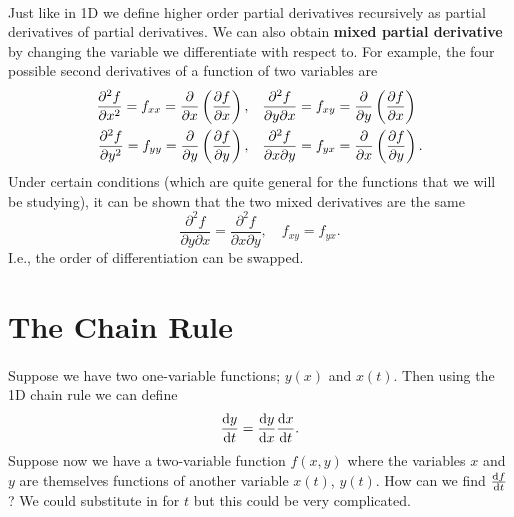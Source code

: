 \documentclass[../multivariate_calculus.tex]{subfiles}
\begin{document}
        \paragraph{}
        Just like in 1D we define higher order partial derivatives recursively as partial derivatives of partial derivatives.
        We can also obtain \textbf{mixed partial derivative} by changing the variable we differentiate with respect to.
        For example, the four possible second derivatives of a function of two variables are
        \begin{align}
            \pdv[2]{f}{x}=f_{xx}=\pdv{}{x}\left(\pdv{f}{x}\right),&\quad\frac{\partial^2 f}{\partial y\partial x}=f_{xy}=\pdv{}{y}\left(\pdv{f}{x}\right)\\
            \pdv[2]{f}{y}=f_{yy}=\pdv{}{y}\left(\pdv{f}{y}\right),&\quad\frac{\partial^2 f}{\partial x\partial y}=f_{yx}=\pdv{}{x}\left(\pdv{f}{y}\right).
        \end{align}
        Under certain conditions (which are quite general for the functions that we will be studying), it can be shown that the two mixed derivatives are the same
        \begin{equation}
            \frac{\partial^2 f}{\partial y\partial x}=\frac{\partial^2 f}{\partial x\partial y},\quad f_{xy}=f_{yx}.
        \end{equation}
        I.e., the order of differentiation can be swapped.

    \section{The Chain Rule}
        \paragraph{}
        Suppose we have two one-variable functions; $y(x)$ and $x(t)$.
        Then using the 1D chain rule we can define
        \begin{equation}
            \dv{y}{t}=\dv{y}{x}\dv{x}{t}.
        \end{equation}
        Suppose now we have a two-variable function $f(x,y)$ where the variables $x$ and $y$ are themselves functions of another variable $x(t)$, $y(t)$.
        How can we find $\dv{f}{t}$?
        We could substitute in for $t$ but this could be very complicated.
\end{document}
